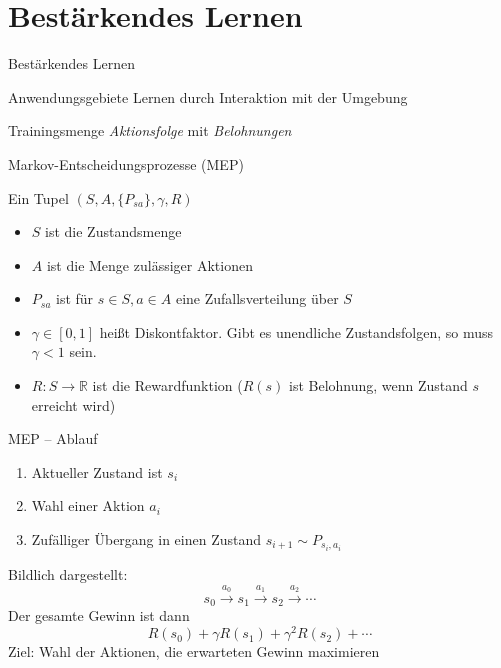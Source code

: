 \documentclass[xcolor={dvipsnames,svgnames},draft]{beamer}
\begin{document}
\section{Bestärkendes Lernen}

\begin{frame}{Bestärkendes Lernen}

  \begin{exampleblock}{Anwendungsgebiete}
     Lernen durch Interaktion mit der Umgebung
  \end{exampleblock}

  \begin{block}{Trainingsmenge}
    \textit{Aktionsfolge} mit \textit{Belohnungen}
  \end{block}

\end{frame}

\begin{frame}{Markov-Entscheidungsprozesse (MEP)}

  \begin{definition}
    Ein Tupel $(S, A, \{P_{sa}\},\gamma,R)$
    \begin{itemize}
    \item $S$ ist die Zustandsmenge
    \item $A$ ist die Menge zulässiger Aktionen
    \item $P_{sa}$ ist für $s \in S, a \in A$ eine Zufallsverteilung über $S$
    \item $\gamma \in \left[ 0, 1 \right]$ heißt Diskontfaktor. Gibt es
      unendliche Zustandsfolgen, so muss $\gamma < 1$ sein.
    \item $R : S \to \mathbb{R}$ ist die Rewardfunktion ($R(s)$ ist
      Belohnung, wenn Zustand $s$ erreicht wird)
    \end{itemize}
  \end{definition}
\end{frame}

\begin{frame}{MEP -- Ablauf}
  \begin{enumerate}
  \item Aktueller Zustand ist $s_i$
  \item Wahl einer Aktion $a_i$
  \item Zufälliger Übergang in einen Zustand $s_{i+1} \sim P_{s_i,a_i}$
  \end{enumerate}
  Bildlich dargestellt:
  \[
    s_0 \xrightarrow{a_0} s_1 \xrightarrow{a_1} s_2 \xrightarrow{a_2} \cdots
  \]
  Der gesamte Gewinn ist dann
  \[
    R(s_0) + \gamma R(s_1) + \gamma^2 R(s_2) + \cdots
  \]
  Ziel: Wahl der Aktionen, die erwarteten Gewinn maximieren
\end{frame}
\end{document}
